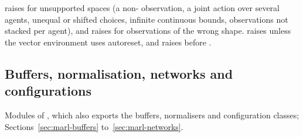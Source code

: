  raises  for unsupported
spaces (a non- observation, a joint  action over
several agents, unequal or shifted  choices, infinite
continuous bounds, observations not stacked per agent), and
 raises  for observations of the wrong shape.
 raises  unless the vector environment uses
 autoreset, and  raises  before
.

\subsection{Buffers, normalisation, networks and configurations}

Modules of , which also exports the buffers,
normalisers and configuration classes; Sections~\ref{sec:marl-buffers}
to~\ref{sec:marl-networks}.

